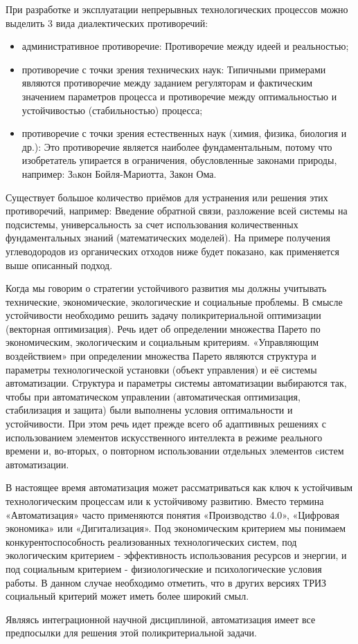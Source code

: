 \documentclass[11pt,a4paper]{article}
\begin{document}
При разработке и эксплуатации непрерывных технологических процессов можно выделить 3 вида диалектических противоречий:
\begin{itemize}
\item административное противоречие: Противоречие между идеей и реальностью;
\item противоречие с точки зрения технических наук: Типичными примерами
  являются противоречие между заданием регуляторам и фактическим значением
  параметров процесса и противоречие между оптимальностью и устойчивостью
  (стабильностью) процесса;
\item противоречие с точки зрения естественных наук (химия, физика, биология и
  др.): Это противоречие является наиболее фундаментальным, потому что
  изобретатель упирается в ограничения, обусловленные законами природы,
  например: Зaкон Бойля-Мариотта, Закон Ома.
\end{itemize}
Существует большое количество приёмов для устранения или решения этих
противоречий, например: Введение обратной связи, разложение всей системы на
подсистемы, универсальность за счет использования количественных
фундаментальных знаний (математических моделей). На примере получения
углеводородов из органических отходов ниже будет показано, как применяется
выше описанный подход.

Когда мы говорим о стратегии устойчивого развития мы должны учитывать
технические, экономические, экологические и социальные проблемы. В смысле
устойчивости необходимо решить задачу поликритериальной оптимизации (векторная
оптимизация). Речь идет об определении множества Парето по экономическим,
экологическим и социальным критериям.  «Управляющим воздействием» при
определении множества Парето являются структура и параметры технологической
установки (объект управления) и её системы автоматизации. Структура и
параметры системы автоматизации выбираются так, чтобы при автоматическом
управлении (автоматическая оптимизация, стабилизация и защита) были выполнены
условия оптимальности и устойчивости. При этом речь идет прежде всего об
адаптивных решениях с использованием элементов искусственного интеллекта в
режиме реального времени и, во-вторых, о повторном использовании отдельных
элементов cистем автоматизации.

В настоящее время автоматизация может рассматриваться как ключ к устойчивым технологическим процессам или к устойчивому развитию. Вместо термина  «Автоматизация» часто применяются понятия  «Производство 4.0»,  «Цифровая экономика» или  «Дигитализация».
Под экономическим критерием мы понимаем конкурентоспособность реализованных
технологических систем, под экологическим критерием - эффективность
использования ресурсов и энергии, и под социальным критерием - физиологические
и психологические условия работы. В данном случае необходимо отметить, что в
других версиях ТРИЗ социальный критерий может иметь более широкий смыл.

Являясь интеграционной научной дисциплиной, автоматизация имеет все
предпосылки для решения этой поликритериальной задачи.
\end{document}
